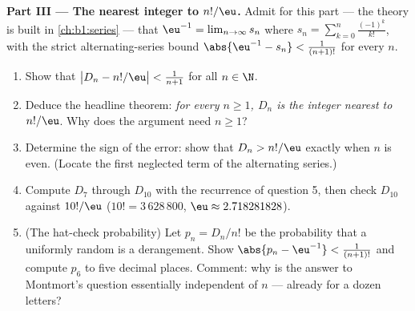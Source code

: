 \begin{problem}
\medskip
\noindent\textbf{Part III --- The nearest integer to
$n!/\eu$.} Admit for this part --- the theory is built in
\cref{ch:b1:series} --- that
$\eu^{-1} = \lim_{n \to \infty} s_n$ where $s_n = \sum_{k=0}^{n}
\frac{(-1)^k}{k!}$, with the strict alternating-series bound
$\abs{\eu^{-1} - s_n} < \frac1{(n+1)!}$ for every $n$.
\begin{enumerate}[resume]
  \item Show that $\bigl| D_n - n!/\eu \bigr| < \frac1{n+1}$ for
        all $n \in \N$.
  \item Deduce the headline theorem: \emph{for every $n \geq 1$,
        $D_n$ is the integer nearest to $n!/\eu$}. Why does the
        argument need $n \geq 1$?
  \item Determine the sign of the error: show that $D_n > n!/\eu$
        exactly when $n$ is even. (Locate the first neglected term
        of the alternating series.)
  \item Compute $D_7$ through $D_{10}$ with the recurrence of
        question 5, then check $D_{10}$ against $10!/\eu$
        ($10! = 3\,628\,800$, $\eu \approx 2.718281828$).
  \item (The hat-check probability) Let $p_n = D_n/n!$ be the
        probability that a uniformly random  is a
        derangement. Show $\abs{p_n - \eu^{-1}} < \frac1{(n+1)!}$
        and compute $p_6$ to five decimal places. Comment: why is
        the answer to Montmort's question essentially independent
        of $n$ --- already for a dozen letters?
\end{enumerate}


\end{problem}
